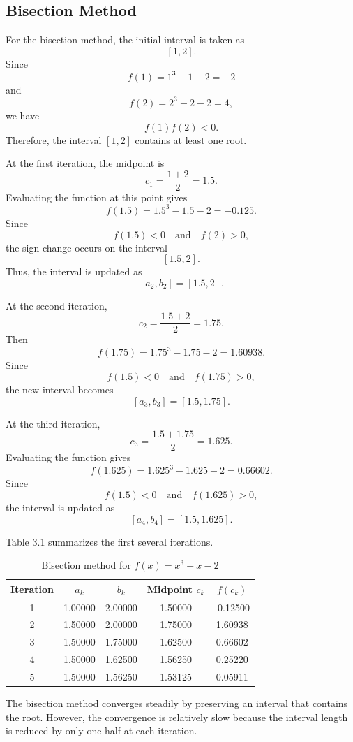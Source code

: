 \subsection{Bisection Method}

For the bisection method, the initial interval is taken as
\[
[1,2].
\]
Since
\[
f(1)=1^3-1-2=-2
\]
and
\[
f(2)=2^3-2-2=4,
\]
we have
\[
f(1)f(2)<0.
\]
Therefore, the interval \([1,2]\) contains at least one root.

At the first iteration, the midpoint is
\[
c_1=\frac{1+2}{2}=1.5.
\]
Evaluating the function at this point gives
\[
f(1.5)=1.5^3-1.5-2=-0.125.
\]
Since
\[
f(1.5)<0
\quad \text{and} \quad
f(2)>0,
\]
the sign change occurs on the interval
\[
[1.5,2].
\]
Thus, the interval is updated as
\[
[a_2,b_2]=[1.5,2].
\]

At the second iteration,
\[
c_2=\frac{1.5+2}{2}=1.75.
\]
Then
\[
f(1.75)=1.75^3-1.75-2=1.60938.
\]
Since
\[
f(1.5)<0
\quad \text{and} \quad
f(1.75)>0,
\]
the new interval becomes
\[
[a_3,b_3]=[1.5,1.75].
\]

At the third iteration,
\[
c_3=\frac{1.5+1.75}{2}=1.625.
\]
Evaluating the function gives
\[
f(1.625)=1.625^3-1.625-2=0.66602.
\]
Since
\[
f(1.5)<0
\quad \text{and} \quad
f(1.625)>0,
\]
the interval is updated as
\[
[a_4,b_4]=[1.5,1.625].
\]

Table 3.1 summarizes the first several iterations.

\begin{table}[h!]
\centering
\caption{Bisection method for \(f(x)=x^3-x-2\)}
\label{tab:bisection_example}
\begin{tabular}{|c|c|c|c|c|}
\hline
Iteration & \(a_k\) & \(b_k\) & Midpoint \(c_k\) & \(f(c_k)\) \\ \hline
1 & 1.00000 & 2.00000 & 1.50000 & -0.12500 \\ \hline
2 & 1.50000 & 2.00000 & 1.75000 & 1.60938 \\ \hline
3 & 1.50000 & 1.75000 & 1.62500 & 0.66602 \\ \hline
4 & 1.50000 & 1.62500 & 1.56250 & 0.25220 \\ \hline
5 & 1.50000 & 1.56250 & 1.53125 & 0.05911 \\ \hline
\end{tabular}
\end{table}

The bisection method converges steadily by preserving an interval that contains the root. However, the convergence is relatively slow because the interval length is reduced by only one half at each iteration.

